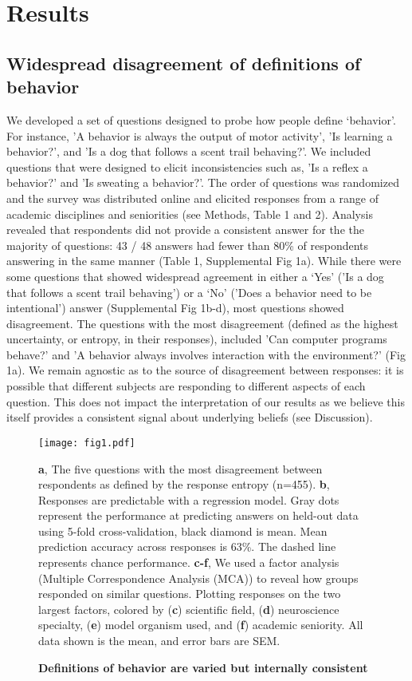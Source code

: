 \documentclass[a4paper, 11pt]{article}
\begin{document}
\vspace{24pt}
\section*{Results}

\subsection*{Widespread disagreement of definitions of behavior}
We developed a set of questions designed to probe how people define `behavior'. For instance, 'A behavior is always the output of motor activity', 'Is learning a behavior?', and 'Is a dog that follows a scent trail behaving?'. We included questions that were designed to elicit inconsistencies such as, 'Is a reflex a behavior?' and 'Is sweating a behavior?'. The order of questions was randomized and the survey was distributed online and elicited responses from a range of academic disciplines and seniorities (see Methods, Table 1 and 2). Analysis revealed that respondents did not provide a consistent answer for the the majority of questions: 43 / 48 answers had fewer than 80\% of respondents answering in the same manner (Table 1, Supplemental Fig 1a). While there were some questions that showed widespread agreement in either a `Yes' ('Is a dog that follows a scent trail behaving') or a `No' ('Does a behavior need to be intentional') answer (Supplemental Fig 1b-d), most questions showed disagreement. The questions with the most disagreement (defined as the highest uncertainty, or entropy, in their responses), included 'Can computer programs behave?' and 'A behavior always involves interaction with the environment?' (Fig 1a). We remain agnostic as to the source of disagreement between responses: it is possible that different subjects are responding to different aspects of each question. This does not impact the interpretation of our results as we believe this itself provides a consistent signal about underlying beliefs (see Discussion).

\begin{figure}
\centerline{\texttt{[image: fig1.pdf]}}
\caption{\textbf{Definitions of behavior are varied but internally consistent}} \textbf{a}, The five questions with the most disagreement between respondents as defined by the response entropy (n=455). \textbf{b}, Responses are predictable with a regression model. Gray dots represent the performance at predicting answers on held-out data using 5-fold cross-validation, black diamond is mean. Mean prediction accuracy across responses is 63\%. The dashed line represents chance performance. \textbf{c-f}, We used a factor analysis (Multiple Correspondence Analysis (MCA)) to reveal how groups responded on similar questions. Plotting responses on the two largest factors, colored by (\textbf{c}) scientific field, (\textbf{d}) neuroscience specialty, (\textbf{e}) model organism used, and (\textbf{f}) academic seniority. All data shown is the mean, and error bars are SEM.
\end{figure}
\end{document}

